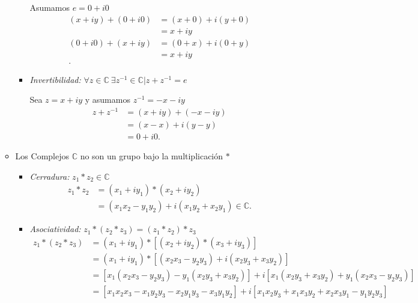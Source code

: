 \documentclass{report}
\begin{document}
\begin{enumerate}
\begin{itemize}
\begin{itemize}
	    Asumamos $e = 0 + i0$
	    \begin{align*}
	      \left( x + iy \right) + \left( 0+i0 \right) &= \left( x+0 \right) +i\left( y+0 \right) \\
	      &= x+iy \\
	      \left( 0 + i 0 \right) + \left( x + iy \right) &= \left( 0+x \right) + i\left( 0 +y \right)  \\
	      &= x+iy \\
	    .\end{align*}
	  \item \textit{Invertibilidad:} $\forall z \in \mathbb{C}\ \exists z^{-1}\in\mathbb{C} | z + z^{-1}=e$

	    Sea $z=x+iy$ y asumamos $z^{-1}=-x-iy$
	    \begin{align*}
	      z + z^{-1} &= \left( x + iy \right) + \left( -x - iy \right) \\
	      &= \left( x-x \right) + i\left( y-y \right)  \\
	      &= 0 + i0
	    .\end{align*}
	\end{itemize}
      \item Los Complejos $\mathbb{C}$ no son un grupo bajo la multiplicación $*$
	\begin{itemize}
	  \item \textit{Cerradura:} $z_1*z_2\in \mathbb{C}$
	    \begin{align*}
	      z_1*z_2&= \left( x_1+iy_1 \right) * \left( x_2 + iy_2 \right)  \\
		     &= \left( x_1x_2 - y_1y_2 \right) + i\left( x_1y_2 + x_2y_1 \right)  \in \mathbb{C}
	    .\end{align*}
	  \item \textit{Asociatividad:} $z_1*\left( z_2*z_3 \right) = \left( z_1*z_2 \right) *z_3$
	    \begin{align*}
	      z_1*\left( z_2*z_3 \right) &= \left( x_1+iy_1 \right) *\left[ \left( x_2+iy_2 \right) * \left( x_3 + iy_3 \right)  \right] \\
	      &= \left( x_1 + iy_1 \right) * \left[ \left( x_2x_3 - y_2y_3 \right) + i \left( x_2y_3 + x_3y_2 \right)  \right]  \\
	      &= \left[ x_1\left(x_2x_3 - y_2y_3  \right) - y_1\left( x_2y_3 + x_3y_2 \right)   \right]  + i \left[ x_1\left( x_2y_3+x_3y_2 \right) + y_1\left( x_2x_3-y_2y_3 \right)  \right] \\
	      &= \left[ x_1x_2x_3 - x_1y_2y_3 - x_2y_1y_3 - x_3y_1y_2 \right] + i \left[ x_1x_2y_3+x_1x_3y_2 + x_2x_3y_1 - y_1y_2y_3 \right]  \\

\end{align*}
\end{itemize}
\end{itemize}
\end{enumerate}
\end{document}
